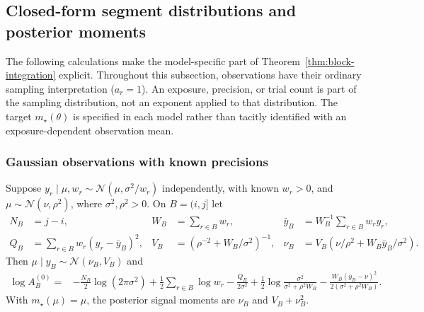 \subsection{Closed-form segment distributions and posterior moments}
\label{sec:family-derivations}
The following calculations make the model-specific part of Theorem~\ref{thm:block-integration} explicit. Throughout this subsection, observations have their ordinary sampling interpretation ($a_r=1$). An exposure, precision, or trial count is part of the sampling distribution, not an exponent applied to that distribution. The target $m_\star(\theta)$ is specified in each model rather than tacitly identified with an exposure-dependent observation mean.

\subsubsection{Gaussian observations with known precisions}
\begin{proposition}
\label{prop:gaussian-family}
Suppose $y_r\mid\mu,w_r\sim\mathcal N(\mu,\sigma^2/w_r)$ independently, with known $w_r>0$, and $\mu\sim\mathcal N(\nu,\rho^2)$, where $\sigma^2,\rho^2>0$. On $B=(i,j]$ let
\begin{align*}
N_B&=j-i, & W_B&=\sum_{r\in B}w_r,
& \bar y_B&=W_B^{-1}\sum_{r\in B}w_ry_r,\\
Q_B&=\sum_{r\in B}w_r(y_r-\bar y_B)^2,
& V_B&=(\rho^{-2}+W_B/\sigma^2)^{-1},
& \nu_B&=V_B(\nu/\rho^2+W_B\bar y_B/\sigma^2).
\end{align*}
Then $\mu\mid y_B\sim\mathcal N(\nu_B,V_B)$ and
\begin{align}
\log A^{(0)}_B={}&-\frac{N_B}{2}\log(2\pi\sigma^2)
+\frac12\sum_{r\in B}\log w_r-\frac{Q_B}{2\sigma^2}
+\frac12\log\frac{\sigma^2}{\sigma^2+\rho^2W_B}
-\frac{W_B(\bar y_B-\nu)^2}{2(\sigma^2+\rho^2W_B)}.
\label{eq:gaussian-evidence-derived}
\end{align}
With $m_\star(\mu)=\mu$, the posterior signal moments are $\nu_B$ and $V_B+\nu_B^2$.
\end{proposition}
